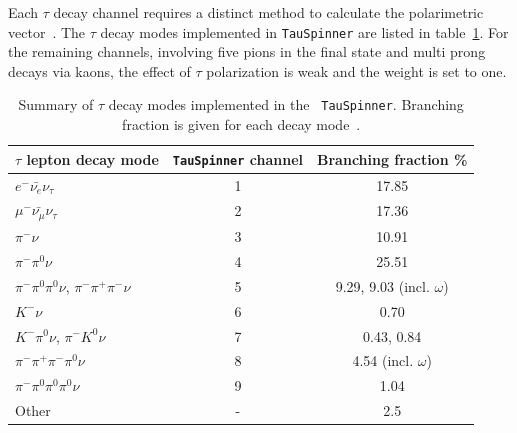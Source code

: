 \documentclass[12pt]{article}
\def\Tau{\ensuremath{\tau}\xspace}
\begin{document}
Each \Tau decay channel requires a distinct method to calculate
the polarimetric vector~\cite{Davidson:2010rw}.
The \Tau decay modes implemented in {\tt TauSpinner} are 
listed in table~\ref{tab:TauModes}. For the remaining channels, involving 
five pions in the final state and multi prong decays via kaons, the
effect of \Tau polarization is weak and the weight is set to one.
\begin{table}[h]
 \begin{center}
  \begin{tabular}{|l|c|c|}
   \hline \hline
\Tau lepton decay mode & {\tt TauSpinner} channel & Branching fraction \%\\
   \hline
$e^-\bar{\nu_e}\nu_\tau$ & 1 & 17.85\\
$\mu^-\bar{\nu_\mu}\nu_\tau$ & 2 & 17.36\\
$\pi^-\nu$ & 3& 10.91\\
$\pi^-\pi^0\nu$ & 4& 25.51\\
$\pi^-\pi^0\pi^0\nu$, $\pi^-\pi^+\pi^-\nu$ & 5& 9.29, 9.03 (incl. $\omega$)\\
$K^-\nu$ & 6& 0.70\\
$K^-\pi^0\nu$, $\pi^- K^0\nu$ & 7& 0.43, 0.84\\
$\pi^-\pi^+\pi^-\pi^0\nu$ & 8& 4.54 (incl. $\omega$)\\
$\pi^-\pi^0\pi^0\pi^0\nu$ & 9& 1.04\\
Other & - & 2.5\\
   \hline \hline
  \end{tabular}
 \caption{Summary of \Tau decay modes implemented in the {\tt
   TauSpinner}. Branching fraction is given for each decay mode~\cite{PDG}.}
 \label{tab:TauModes}
 \end{center}
\end{table}
\end{document}
